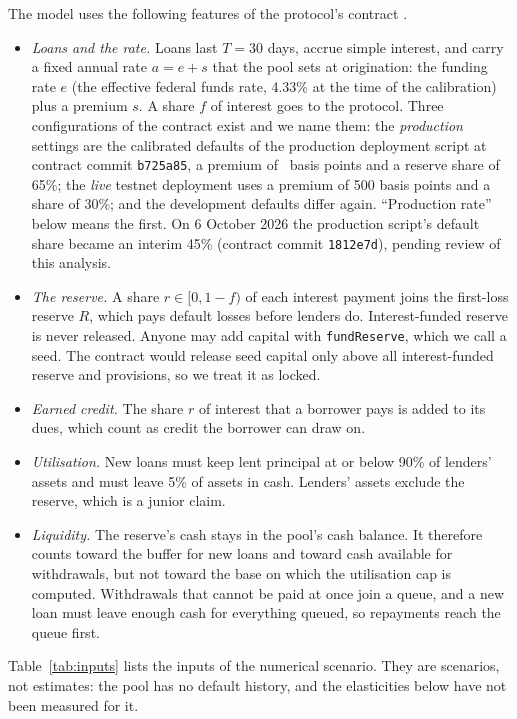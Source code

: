 \documentclass[preprint,11pt,authoryear]{elsarticle}
\theoremstyle{definition}
\begin{document}
The model uses the following features of the protocol's contract \citep{microcredit2026contract}.
\begin{itemize}
\item \emph{Loans and the rate.} Loans last $T=30$ days, accrue simple interest, and carry a fixed annual
  rate $a=e+s$ that the pool sets at origination: the funding rate $e$ (the effective federal funds
  rate, 4.33\% at the time of the calibration) plus a premium $s$. A share $f$ of interest goes to the
  protocol. Three configurations of the contract exist and we name them: the \emph{production} settings
  are the calibrated defaults of the production deployment script at contract commit \texttt{b725a85},
  a premium of \PremBps\ basis points and a reserve share of 65\%; the \emph{live} testnet deployment
  uses a premium of 500 basis points and a share of 30\%; and the development defaults differ again.
  ``Production rate'' below means the first. On 6 October 2026 the production script's default share
  became an interim 45\% (contract commit \texttt{1812e7d}), pending review of this analysis.
\item \emph{The reserve.} A share $r\in[0,1-f)$ of each interest payment joins the first-loss reserve $R$,
  which pays default losses before lenders do. Interest-funded reserve is never released. Anyone may
  add capital with \texttt{fundReserve}, which we call a seed. The contract would release seed
  capital only above all interest-funded reserve and provisions, so we treat it as locked.
\item \emph{Earned credit.} The share $r$ of interest that a borrower pays is added to its dues, which
  count as credit the borrower can draw on.
\item \emph{Utilisation.} New loans must keep lent principal at or below 90\% of lenders' assets and must
  leave 5\% of assets in cash. Lenders' assets exclude the reserve, which is a junior claim.
\item \emph{Liquidity.} The reserve's cash stays in the pool's cash balance. It therefore counts toward the
  buffer for new loans and toward cash available for withdrawals, but not toward the base on which the
  utilisation cap is computed. Withdrawals that cannot be paid at once join a queue, and a new loan
  must leave enough cash for everything queued, so repayments reach the queue first.
\end{itemize}
Table~\ref{tab:inputs} lists the inputs of the numerical scenario. They are scenarios, not estimates:
the pool has no default history, and the elasticities below have not been measured for it.
\end{document}
